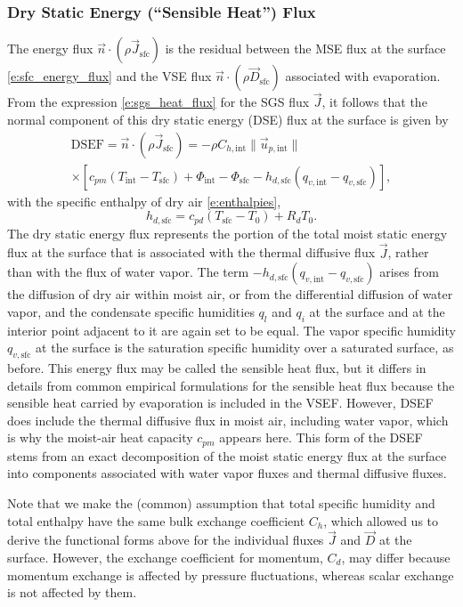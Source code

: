 \documentclass{report}
\begin{document}
\subsubsection{Dry Static Energy (``Sensible Heat'') Flux} The energy flux $\vec{n} \cdot (\rho \vec{J}_{\mathrm{sfc}})$ is the residual between the MSE flux at the surface \eqref{e:sfc_energy_flux} and the VSE flux $\vec{n} \cdot (\rho \vec{D}_\mathrm{sfc})$ associated with evaporation. From the expression \eqref{e:sgs_heat_flux} for the SGS flux $\vec{J}$, it follows that the normal component of this dry static energy (DSE) flux at the surface is given by 
\begin{multline}\label{e:sfc_SHF}
    \mathrm{DSEF} = \vec{n} \cdot (\rho \vec{J}_{\mathrm{sfc}}) =
    -\rho C_{h, \mathrm{int}} \| \vec{u}_{p, \mathrm{int}} \|
    \\
    \times \left[ c_{pm} \left(T_\mathrm{int} - T_\mathrm{sfc} \right) + \Phi_\mathrm{int} - \Phi_\mathrm{sfc}
    - h_{d,\mathrm{sfc}}  \left( q_{v, \mathrm{int}} - q_{v, \mathrm{sfc}} \right) \right],
\end{multline}
with the specific enthalpy of dry air \eqref{e:enthalpies},
\[
h_{d, \mathrm{sfc}} = c_{pd} (T_\mathrm{sfc} - T_0) + R_d T_0.
\]
The dry static energy flux represents the portion of the total moist static energy flux at the surface that is associated with the thermal diffusive flux $\vec{J}$, rather than with the flux of water vapor. The term $-h_{d,\mathrm{sfc}}  \left( q_{v, \mathrm{int}} - q_{v, \mathrm{sfc}} \right)$ arises from the diffusion of dry air within moist air, or from the differential diffusion of water vapor, and the condensate specific humidities $q_l$ and $q_i$ at the surface and at the interior point adjacent to it are again set to be equal. The vapor specific humidity $q_{v, \mathrm{sfc}}$ at the surface is the saturation specific humidity over a saturated surface, as before. This energy flux may be called the sensible heat flux, but it differs in details from common empirical formulations for the sensible heat flux because the sensible heat carried by evaporation is included in the VSEF. However, DSEF does include the thermal diffusive flux in moist air, including water vapor, which is why the moist-air heat capacity $c_{pm}$ appears here. This form of the DSEF stems from an exact decomposition of the moist static energy flux at the surface into components associated with water vapor fluxes and thermal diffusive fluxes.

Note that we make the (common) assumption that total specific humidity and total enthalpy have the same bulk exchange coefficient $C_h$, which allowed us to derive the functional forms above for the individual fluxes $\vec{J}$ and $\vec{D}$ at the surface.  However, the exchange coefficient for momentum, $C_d$, may differ because momentum exchange is affected by pressure fluctuations, whereas scalar exchange is not affected by them.
\end{document}
